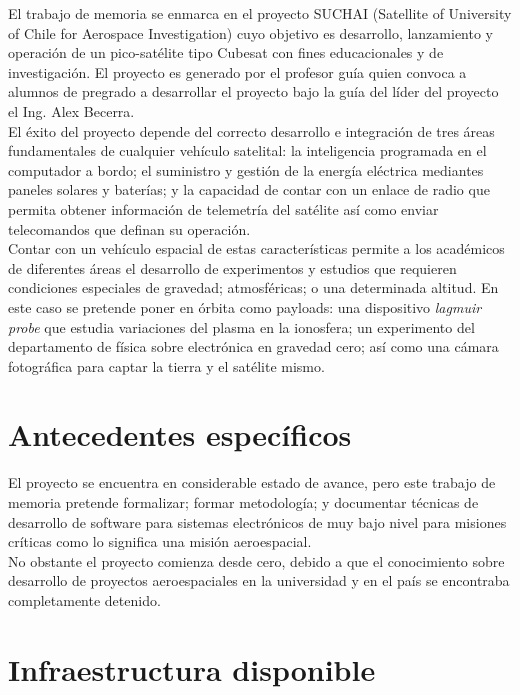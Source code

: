 \documentclass[11pt,letterpaper]{article}
\begin{document}
El trabajo de memoria se enmarca en el proyecto SUCHAI (Satellite of University of Chile for Aerospace Investigation) cuyo objetivo es desarrollo, lanzamiento y operación de un pico-satélite tipo Cubesat con fines educacionales y de investigación. El proyecto es generado por el profesor guía quien convoca a alumnos de pregrado a desarrollar el proyecto bajo la guía del líder del proyecto el Ing. Alex Becerra.\\

El éxito del proyecto depende del correcto desarrollo e integración de tres áreas fundamentales de cualquier vehículo satelital: la inteligencia programada en el computador a bordo; el suministro y gestión de la energía eléctrica mediantes paneles solares y baterías; y la capacidad de contar con un enlace de radio que permita obtener información de telemetría del satélite así como enviar telecomandos que definan su operación.\\

Contar con un vehículo espacial de estas características permite a los académicos de diferentes áreas el desarrollo de experimentos y estudios que requieren condiciones especiales de gravedad; atmosféricas; o una determinada altitud. En este caso se pretende poner en órbita como payloads: una dispositivo \textit{lagmuir probe} que estudia variaciones del plasma en la ionosfera; un experimento del departamento de física sobre electrónica en gravedad cero; así como una cámara fotográfica para captar la tierra y el satélite mismo. 

\section{Antecedentes específicos}

El proyecto se encuentra en considerable estado de avance, pero este trabajo de memoria pretende formalizar; formar metodología; y documentar técnicas de desarrollo de software para sistemas electrónicos de muy bajo nivel para misiones críticas como lo significa una misión aeroespacial.\\

No obstante el proyecto comienza desde cero, debido a que el conocimiento sobre desarrollo de proyectos aeroespaciales en la universidad y en el país se encontraba completamente detenido.

\section{Infraestructura disponible}
\end{document}
